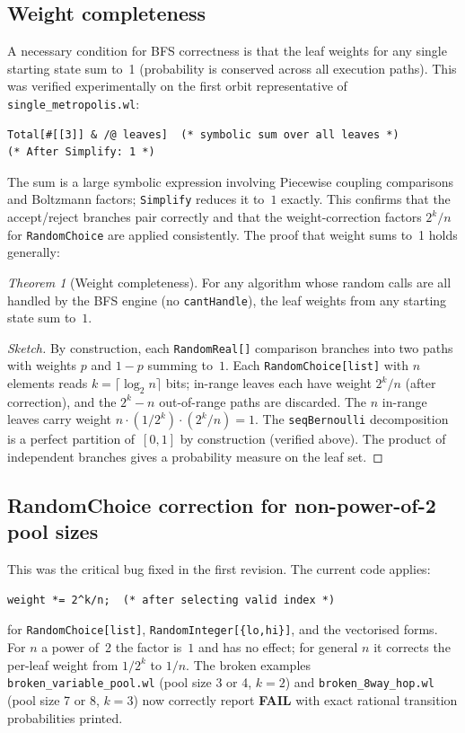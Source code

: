 \documentclass[12pt,a4paper]{article}
\theoremstyle{critical}
\theoremstyle{remark}
\newtheorem{theorem}{Theorem}
\theoremstyle{verified}
\begin{document}
\subsection{Weight completeness}

A necessary condition for BFS correctness is that the leaf weights for any
single starting state sum to~1 (probability is conserved across all execution
paths).  This was verified experimentally on the first orbit representative of
\texttt{single\_metropolis.wl}:

\begin{lstlisting}
Total[#[[3]] & /@ leaves]  (* symbolic sum over all leaves *)
(* After Simplify: 1 *)
\end{lstlisting}

The sum is a large symbolic expression involving Piecewise coupling comparisons
and Boltzmann factors; \texttt{Simplify} reduces it to~$1$ exactly.  This
confirms that the accept/reject branches pair correctly and that the
weight-correction factors $2^k/n$ for \texttt{RandomChoice} are applied
consistently.  The proof that weight sums to~1 holds generally:

\begin{theorem}[Weight completeness]
For any algorithm whose random calls are all handled by the BFS engine (no
\texttt{cantHandle}), the leaf weights from any starting state sum to~$1$.
\end{theorem}

\begin{proof}[Sketch]
By construction, each \texttt{RandomReal[]} comparison branches into two paths
with weights $p$ and $1-p$ summing to~$1$.  Each \texttt{RandomChoice[list]}
with $n$ elements reads $k = \lceil\log_2 n\rceil$ bits; in-range leaves each
have weight $2^k/n$ (after correction), and the $2^k - n$ out-of-range paths
are discarded.  The $n$ in-range leaves carry weight $n \cdot (1/2^k) \cdot
(2^k/n) = 1$.  The \texttt{seqBernoulli} decomposition is a perfect partition
of~$[0,1]$ by construction (verified above).  The product of independent
branches gives a probability measure on the leaf set.
\end{proof}

\subsection{RandomChoice correction for non-power-of-2 pool sizes}

This was the critical bug fixed in the first revision.  The current code applies:
\begin{lstlisting}
weight *= 2^k/n;  (* after selecting valid index *)
\end{lstlisting}
for \texttt{RandomChoice[list]}, \texttt{RandomInteger[\{lo,hi\}]}, and the
vectorised forms.  For $n$ a power of~2 the factor is~$1$ and has no effect;
for general $n$ it corrects the per-leaf weight from $1/2^k$ to $1/n$.  The
broken examples \texttt{broken\_variable\_pool.wl} (pool size 3 or 4, $k=2$)
and \texttt{broken\_8way\_hop.wl} (pool size 7 or 8, $k=3$) now correctly
report \textbf{FAIL} with exact rational transition probabilities printed.
\end{document}
